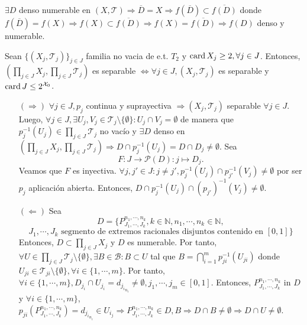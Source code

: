 \begin{dem}
  $\exists D$ denso numerable en $( X, \mathcal{T} ) \Rightarrow \overline{D} = X \Rightarrow f(\overline{D}) \subset \overline{f(D)}$ donde $f(\overline{D}) = f(X) \Rightarrow f(X) \subset \overline{f(D)} \Rightarrow f(X) = \overline{f(D)} \Rightarrow f(D)$ denso y numerable.
\end{dem}

\begin{prop}
  Sean $\{ ( X_{j}, \mathcal{T}_{j} ) \}_{j \in J}$ familia no vacia de e.t. $T_{2}$ y $\operatorname{card} X_{j} \geq 2, \forall j \in J$. Entonces, $( \prod_{j \in J} X_{j}, \prod_{j \in J} \mathcal{T}_{j} )$ es separable $ \Leftrightarrow \forall j \in J, ( X_{j}, \mathcal{T}_{j} )$ es separable y $\operatorname{card} J \leq 2^{\mathcal{X}_{0}}$.
\end{prop}

\begin{dem}
  \begin{enumerate}[label=(\roman*)]
    \item []
    \item [$(\Rightarrow)$] $\forall j \in J, p_{j} $ continua y suprayectiva $\Rightarrow ( X_{j}, \mathcal{T}_{j} )$ separable $\forall j \in J$. Luego, $\forall j \in J, \exists U_{j}, V_{j} \in \mathcal{T}_{j} \setminus \{  \emptyset \}  : U_{j} \cap V_{j} = \emptyset$ de manera que $p_{j}^{-1}(U_{j}) \in \prod_{j \in J} \mathcal{T}_{j}$ no vacío y $\exists D$ denso en $( \prod_{j \in J} X_{j}, \prod_{j \in J} \mathcal{T}_{j} ) \Rightarrow D \cap p_{j}^{-1}(U_{j}) = D \cap D_{j} \neq \emptyset$. Sea
      \[
        F: J \to \mathcal{P}(D) : j \mapsto D_{j}.
      \]
      Veamos que $F$ es inyectiva. $\forall j, j' \in J : j \neq j', p_{j}^{-1}(U_{j}) \cap p_{j'}^{-1}(V_{j}) \neq \emptyset$ por ser $p_{j}$ aplicación abierta. Entonces, $D \cap p_{j}^{-1}(U_{j}) \cap (p_{j'})^{-1}(V_{j}) \neq \emptyset$.
    \item [$(\Leftarrow)$] Sea
      \[
        D = \{  P^{n_{1}, \cdots, n_{k}}_{J_{1}, \cdots, J_{k}}, k \in \mathbb{N}, n_{1}, \cdots, n_{k} \in \mathbb{N},
      \]
      \[
         J_{1}, \cdots, J_{k} \text{ segmento de extremos racionales disjuntos contenido en } [0,1] \}
      \]
      Entonces, $D \subset \prod_{j \in J} X_{j}$ y $D$ es numerable. Por tanto, $\forall U \in \prod_{j \in J} \mathcal{T}_{j} \setminus \{ \emptyset \}, \exists B \in \mathcal{B} : B \subset U$ tal que $B = \bigcap_{i = 1}^{m} p_{ji}^{-1}(U_{ji})$ donde $U_{ji} \in \mathcal{T}_{ji} \setminus \{ \emptyset \}, \forall i \in \{  1, \cdots, m \}$. Por tanto, $\forall i \in \{  1, \cdots, m \}, D_{j_i} \cap U_{j_i} = d_{j_i}_{n_i} \neq \emptyset, j_{1}, \cdots, j_{m} \in [0, 1]$. Entonces, $P^{n_{1}, \cdots, n_{k}}_{J_{1}, \cdots, J_{k}}$ in $D$ y $\forall i \in \{ 1, \cdots, m \}$, $p_{ji}(P^{n_{1}, \cdots, n_{k}}_{J_{1}, \cdots, J_{k}}) = d_{j_{i}}_{n_{i}} \in U_{i_{j}} \Rightarrow P^{n_{1}, \cdots, n_{k}}_{J_{1}, \cdots, J_{k}} \in D, B \Rightarrow D \cap B \neq \emptyset \Rightarrow D \cap U \neq \emptyset$.
  \end{enumerate}
\end{dem}
